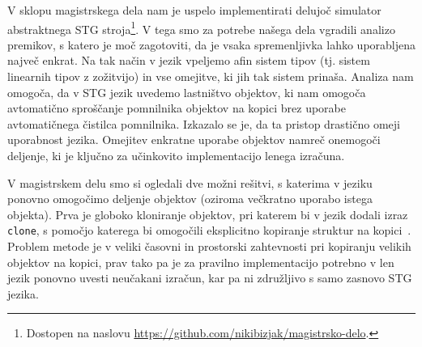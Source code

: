 

V sklopu magistrskega dela nam je uspelo implementirati delujoč simulator abstraktnega STG stroja\footnote{Dostopen na naslovu \url{https://github.com/nikibizjak/magistrsko-delo}.}. V tega smo za potrebe našega dela vgradili analizo premikov, s katero je moč zagotoviti, da je vsaka spremenljivka lahko uporabljena največ enkrat. Na tak način v jezik vpeljemo afin sistem tipov (tj. sistem linearnih tipov z zožitvijo) in vse omejitve, ki jih tak sistem prinaša. Analiza nam omogoča, da v STG jezik uvedemo lastništvo objektov, ki nam omogoča avtomatično sproščanje pomnilnika objektov na kopici brez uporabe avtomatičnega čistilca pomnilnika. Izkazalo se je, da ta pristop drastično omeji uporabnost jezika. Omejitev enkratne uporabe objektov namreč onemogoči deljenje, ki je ključno za učinkovito implementacijo lenega izračuna.

V magistrskem delu smo si ogledali dve možni rešitvi, s katerima v jeziku ponovno omogočimo deljenje objektov (oziroma večkratno uporabo istega objekta). Prva je globoko kloniranje objektov, pri katerem bi v jezik dodali izraz \texttt{clone}, s pomočjo katerega bi omogočili eksplicitno kopiranje struktur na kopici~\cite{wadler1990linear, marshall2024functional, lafont1988linear}. Problem metode je v veliki časovni in prostorski zahtevnosti pri kopiranju velikih objektov na kopici, prav tako pa je za pravilno implementacijo potrebno v len jezik ponovno uvesti neučakani izračun, kar pa ni združljivo s samo zasnovo STG jezika.

